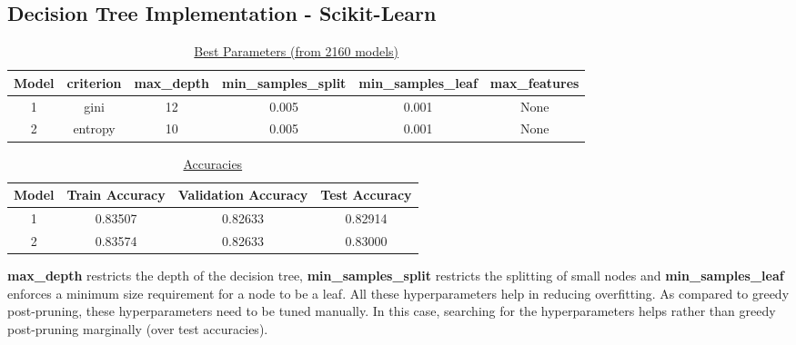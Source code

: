 \documentclass[12pt]{article}
\begin{document}
\subsection*{Decision Tree Implementation - Scikit-Learn}
\vspace{-7mm}
\begin{table}[h!]
\begin{center}
\caption{\underline{Best Parameters (from 2160 models)}}
\vspace{1mm}
\label{tab:table2}
\begin{tabular}{|c|c|c|c|c|c|}
\hline
\textbf{Model} & \textbf{criterion} & \textbf{max\_depth} & \textbf{min\_samples\_split} & \textbf{min\_samples\_leaf} & \textbf{max\_features} \\
\hline
1 & gini & 12 & 0.005 & 0.001 & None \\
2 & entropy & 10 & 0.005 & 0.001 & None \\
\hline
\end{tabular}
\end{center}
\end{table}
\vspace{-13mm}
\begin{table}[h!]
\begin{center}
\caption{\underline{Accuracies}}
\vspace{1mm}
\label{tab:table3}
\begin{tabular}{|c|c|c|c|}
\hline
\textbf{Model} & \textbf{Train Accuracy} & \textbf{Validation Accuracy} & \textbf{Test Accuracy} \\
\hline
1 & 0.83507 & 0.82633 & 0.82914 \\
2 & 0.83574 & 0.82633 & 0.83000 \\
\hline
\end{tabular}
\end{center}
\end{table}
\vspace{-5mm}
\begin{addmargin}[0.3in]{0in}
\textbf{max\_depth} restricts the depth of the decision tree, \textbf{min\_samples\_split} restricts the splitting of small nodes and \textbf{min\_samples\_leaf} enforces a minimum size requirement for a node to be a leaf. All these hyperparameters help in reducing overfitting. As compared to greedy post-pruning, these hyperparameters need to be tuned manually. In this case, searching for the hyperparameters helps rather than greedy post-pruning marginally (over test accuracies).
\end{addmargin}
\end{document}
